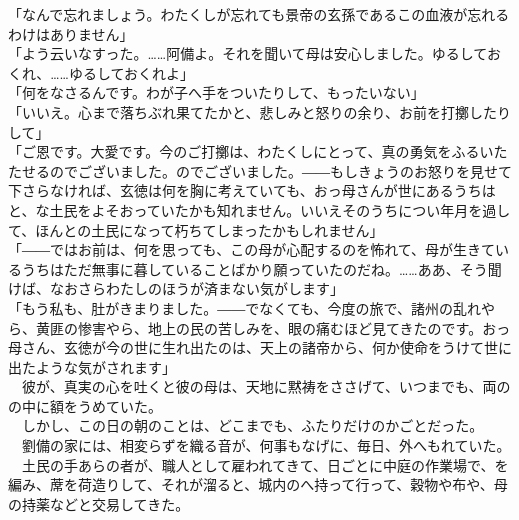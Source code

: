 \documentclass[
  paper=a5,
  fontsize=10pt,
  jafontsize=9.5pt,
  tate,                  %
  open_bracket_pos=nibu, %
]{jlreq}
\begin{document}
「なんで忘れましょう。わたくしが忘れても景帝の玄孫であるこの血液が忘れるわけはありません」\\


「よう云いなすった。……阿備よ。それを聞いて母は安心しました。ゆるしておくれ、……ゆるしておくれよ」\\


「何をなさるんです。わが子へ手をついたりして、もったいない」\\


「いいえ。心まで落ちぶれ果てたかと、悲しみと怒りの余り、お前を打擲したりして」\\


「ご恩です。大愛です。今のご打擲は、わたくしにとって、真の勇気をふるいたたせるのでございました。のでございました。――もしきょうのお怒りを見せて下さらなければ、玄徳は何を胸に考えていても、おっ母さんが世にあるうちはと、な土民をよそおっていたかも知れません。いいえそのうちについ年月を過して、ほんとの土民になって朽ちてしまったかもしれません」\\


「――ではお前は、何を思っても、この母が心配するのを怖れて、母が生きているうちはただ無事に暮していることばかり願っていたのだね。……ああ、そう聞けば、なおさらわたしのほうが済まない気がします」\\


「もう私も、肚がきまりました。――でなくても、今度の旅で、諸州の乱れやら、黄匪の惨害やら、地上の民の苦しみを、眼の痛むほど見てきたのです。おっ母さん、玄徳が今の世に生れ出たのは、天上の諸帝から、何か使命をうけて世に出たような気がされます」\\


　彼が、真実の心を吐くと彼の母は、天地に黙祷をささげて、いつまでも、両のの中に額をうめていた。\\


　しかし、この日の朝のことは、どこまでも、ふたりだけのかごとだった。\\


　劉備の家には、相変らずを織る音が、何事もなげに、毎日、外へもれていた。\\


　土民の手あらの者が、職人として雇われてきて、日ごとに中庭の作業場で、を編み、蓆を荷造りして、それが溜ると、城内のへ持って行って、穀物や布や、母の持薬などと交易してきた。\\
\end{document}
